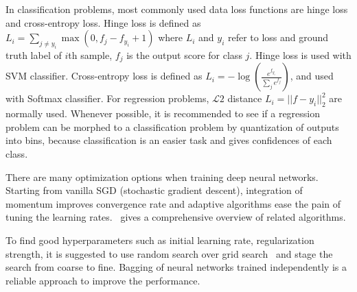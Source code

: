 \begin{description}[labelindent=1cm]
  \item[Loss Functions] In classification problems, most commonly used data loss functions are hinge loss and cross-entropy loss. Hinge loss is defined as $L_i = \sum_ {j\neq y_i} \max(0, f_j-f_{y_i}+1)$ where $L_i$ and $y_i$ refer to loss and ground truth label of $i$th sample, $f_j$ is the output score for class $j$. Hinge loss is used with SVM classifier. Cross-entropy loss is defined as $L_i = -\log(\frac{e^{f_{y_i}}}{\sum_je^{f_j}})$, and used with Softmax classifier. For regression problems, $\mathcal{L}2$ distance $L_i = ||f - y_i||_2^2$ are normally used. Whenever possible, it is recommended to see if a regression problem can be morphed to a classification problem by quantization of outputs into bins, because classification is an easier task and gives confidences of each class.
  \item[Optimization] There are many optimization options when training deep neural networks. Starting from vanilla SGD (stochastic gradient descent), integration of momentum improves convergence rate and adaptive algorithms ease the pain of tuning the learning rates. \cite{links:sgdoptimization}~gives a comprehensive overview of related algorithms.
  \item[Miscellous] To find good hyperparameters such as initial learning rate, regularization strength, it is suggested to use random search over grid search~\cite{bergstra2012random} and stage the search from coarse to fine. Bagging of neural networks trained independently is a reliable approach to improve the performance.
\end{description}
\fi


